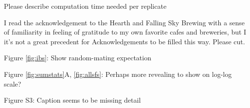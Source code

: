 \begin{point}{\revref}
    Please describe computation time needed per replicate
\end{point}


\begin{point}{\revref}
    I read the acknowledgement to the Hearth and Falling Sky Brewing with a sense of familiarity in feeling of gratitude to my own favorite cafes and breweries, but I it's not a great precedent for Acknowledgements to be filled this way. Please cut.
\end{point}


\begin{point}{Figure \ref{fig:ibs}:}
    Show random-mating expectation
\end{point}


\begin{point}{Figure \ref{fig:sumstats}A, \ref{fig:allsfs}:}
    Perhaps more revealing to show on log-log scale?
\end{point}


\begin{point}{Figure S3:}
    Caption seems to be missing detail 
\end{point}





